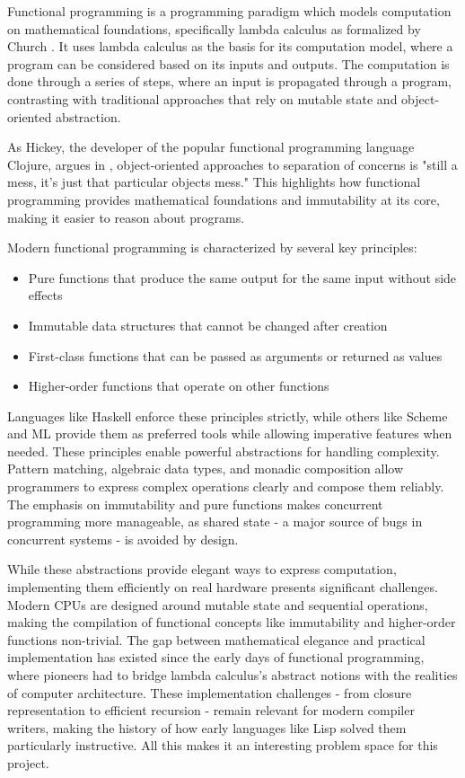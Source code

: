 \documentclass[final]{cmpreport_02}
\begin{document}
Functional programming is a programming paradigm which models computation on mathematical foundations, specifically lambda calculus as formalized by Church \cite{church1936unsolvable}. It uses lambda calculus as the basis for its computation model, where a program can be considered based on its inputs and outputs. The computation is done through a series of steps, where an input is propagated through a program, contrasting with traditional approaches that rely on mutable state and object-oriented abstraction.

As Hickey, the developer of the popular functional programming language Clojure, argues in \cite{hickey2009there}, object-oriented approaches to separation of concerns is "still a mess, it's just that particular objects mess." This highlights how functional programming provides mathematical foundations and immutability at its core, making it easier to reason about programs.

Modern functional programming is characterized by several key principles:
\begin{itemize}
    \item Pure functions that produce the same output for the same input without side effects
    \item Immutable data structures that cannot be changed after creation
    \item First-class functions that can be passed as arguments or returned as values
    \item Higher-order functions that operate on other functions
\end{itemize}

Languages like Haskell enforce these principles strictly, while others like Scheme and ML provide them as preferred tools while allowing imperative features when needed. These principles enable powerful abstractions for handling complexity. Pattern matching, algebraic data types, and monadic composition allow programmers to express complex operations clearly and compose them reliably. The emphasis on immutability and pure functions makes concurrent programming more manageable, as shared state - a major source of bugs in concurrent systems - is avoided by design.

While these abstractions provide elegant ways to express computation, implementing them efficiently on real hardware presents significant challenges. Modern CPUs are designed around mutable state and sequential operations, making the compilation of functional concepts like immutability and higher-order functions non-trivial. The gap between mathematical elegance and practical implementation has existed since the early days of functional programming, where pioneers had to bridge lambda calculus's abstract notions with the realities of computer architecture. These implementation challenges - from closure representation to efficient recursion - remain relevant for modern compiler writers, making the history of how early languages like Lisp solved them particularly instructive. All this makes it an interesting problem space for this project.
\end{document}
